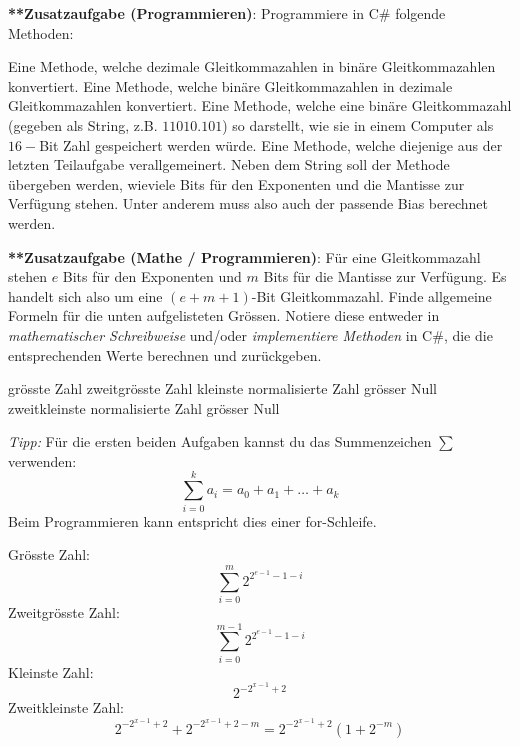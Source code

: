 \begin{question}
	\textbf{**Zusatzaufgabe (Programmieren)}: Programmiere in C\# folgende Methoden:
	\begin{tasks}
		\task Eine Methode, welche dezimale Gleitkommazahlen in binäre Gleitkommazahlen konvertiert. 
		\task Eine Methode, welche binäre Gleitkommazahlen in dezimale Gleitkommazahlen konvertiert. 
		\task Eine Methode, welche eine binäre Gleitkommazahl (gegeben als String, z.B. $11010.101$) so darstellt, wie sie in einem Computer als $16-$Bit Zahl gespeichert werden würde.
		\task Eine Methode, welche diejenige aus der letzten Teilaufgabe verallgemeinert. Neben dem String soll der Methode übergeben werden, wieviele Bits für den Exponenten und die Mantisse zur Verfügung stehen. Unter anderem muss also auch der passende Bias berechnet werden.
	\end{tasks}
\end{question}
\begin{solution}
	
\end{solution}

\newpage

\begin{question}
	\textbf{**Zusatzaufgabe (Mathe / Programmieren)}: Für eine Gleitkommazahl stehen $e$ Bits für den Exponenten und $m$ Bits für die Mantisse zur Verfügung. Es handelt sich also um eine $(e+m+1)$-Bit Gleitkommazahl.
	Finde allgemeine Formeln für die unten aufgelisteten Grössen. Notiere diese entweder in \textit{mathematischer Schreibweise} und/oder \textit{implementiere Methoden} in C\#, die die entsprechenden Werte berechnen und zurückgeben.
	\begin{tasks}
		\task grösste Zahl
		\task zweitgrösste Zahl
		\task kleinste normalisierte Zahl grösser Null
		\task zweitkleinste normalisierte Zahl grösser Null
	\end{tasks}
	\textit{Tipp:} Für die ersten beiden Aufgaben kannst du das Summenzeichen $\sum$ verwenden:
	$$\sum_{i=0}^k a_i = a_0 + a_1 + \ldots + a_k$$
	Beim Programmieren kann entspricht dies einer for-Schleife.
	\grid{16.2}
\end{question}
\begin{solution}
	\begin{tasks}
		\task Grösste Zahl: $$\sum_{i=0}^{m} 2^{2^{e-1}-1-i}$$
		\task Zweitgrösste Zahl: $$\sum_{i=0}^{m-1} 2^{2^{e-1}-1-i}$$
		\task Kleinste Zahl: $$2^{-2^{x-1}+2}$$
		\task Zweitkleinste Zahl:
		$$
		2^{-2^{x-1}+2} + 2^{-2^{x-1}+2 - m}
		= 2^{-2^{x-1}+2}(1+2^{-m})
		$$
	\end{tasks}
\end{solution}

